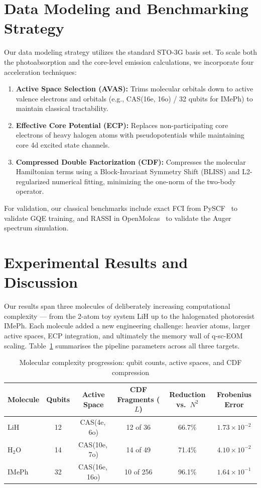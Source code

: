\documentclass[11pt]{article}
\begin{document}
\section{Data Modeling and Benchmarking Strategy}
Our data modeling strategy utilizes the standard STO-3G basis set. To scale both the photoabsorption and the core-level emission calculations, we incorporate four acceleration techniques:
\begin{enumerate}[leftmargin=*,noitemsep,topsep=0pt]
  \item \textbf{Active Space Selection (AVAS):} Trims molecular orbitals down to active valence electrons and orbitals (e.g., CAS(16e, 16o) / 32 qubits for IMePh) to maintain classical tractability.
  \item \textbf{Effective Core Potential (ECP):} Replaces non-participating core electrons of heavy halogen atoms with pseudopotentials while maintaining core 4d excited state channels.
  \item \textbf{Compressed Double Factorization (CDF):} Compresses the molecular Hamiltonian terms using a Block-Invariant Symmetry Shift (BLISS) and L2-regularized numerical fitting, minimizing the one-norm of the two-body operator.
\end{enumerate}
For validation, our classical benchmarks include exact FCI from PySCF~\cite{pyscf2020} to validate GQE training, and RASSI in OpenMolcas~\cite{openmolcas2020} to validate the Auger spectrum simulation.

\section{Experimental Results and Discussion}
Our results span three molecules of deliberately increasing computational complexity --- from the 2-atom toy system LiH up to the halogenated photoresist IMePh. Each molecule added a new engineering challenge: heavier atoms, larger active spaces, ECP integration, and ultimately the memory wall of q-sc-EOM scaling. Table~\ref{tab:complexity} summarises the pipeline parameters across all three targets.

\begin{table}[H]
\centering
\caption{Molecular complexity progression: qubit counts, active spaces, and CDF compression}
\label{tab:complexity}
\vspace{0.5em}
\begin{tabular}{lccccc}
\toprule
\textbf{Molecule} & \textbf{Qubits} & \textbf{Active Space} & \textbf{CDF Fragments ($L$)} & \textbf{Reduction vs.\ $N^2$} & \textbf{Frobenius Error} \\
\midrule
LiH   & 12 & CAS(4e,\,6o)  & 12 of 36 & 66.7\% & $1.73 \times 10^{-2}$ \\
H$_2$O  & 14 & CAS(10e,\,7o) & 14 of 49 & 71.4\% & $4.10 \times 10^{-2}$ \\
IMePh & 32 & CAS(16e,\,16o) & 10 of 256 & 96.1\% & $1.64 \times 10^{-1}$ \\
\bottomrule
\end{tabular}
\end{table}
\end{document}
